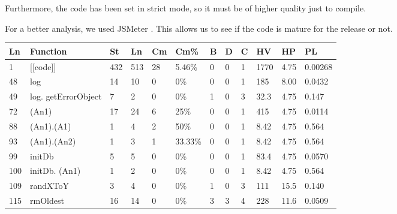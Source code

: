 Furthermore, the code has been set in strict mode, so it must be of higher quality just to compile.

For a better analysis, we used JSMeter \cite{website:jsmeter}. This allows us to see if the code is mature for the release or not.

\noindent \begin{tabular}{|l|p{56px}|l|l|l|l|l|l|l|l|l|l|}
\hline
{\bf Ln} & {\bf Function} & {\bf St} & {\bf Ln} & {\bf Cm} & {\bf Cm\%} & {\bf B} & {\bf D} & {\bf C} & {\bf HV} & {\bf HP} & {\bf PL} \\
\hline
         1 &   [[code]] &        432 &        513 &         28 &     5.46\% &          0 &          0 &          1 &       1770 &       4.75 &    0.00268 \\
\hline
        48 &        log &         14 &         10 &          0 &        0\% &          0 &          0 &          1 &        185 &       8.00 &     0.0432 \\
\hline
        49 & log. getErrorObject &          7 &          2 &          0 &        0\% &          1 &          0 &          3 &       32.3 &       4.75 &      0.147 \\
\hline
        72 & (An1) &         17 &         24 &          6 &       25\% &          0 &          0 &          1 &        415 &       4.75 &     0.0114 \\
\hline
        88 & (An1).(A1) &          1 &          4 &          2 &       50\% &          0 &          0 &          1 &       8.42 &       4.75 &      0.564 \\
\hline
        93 & (An1).(An2) &          1 &          3 &          1 &    33.33\% &          0 &          0 &          1 &       8.42 &       4.75 &      0.564 \\
\hline
        99 & initDb &          5 &          5 &          0 &        0\% &          0 &          0 &          1 &       83.4 &       4.75 &     0.0570 \\
\hline
       100 & initDb. (An1) &          1 &          2 &          0 &        0\% &          0 &          0 &          1 &       8.42 &       4.75 &      0.564 \\
\hline
       109 & randXToY &          3 &          4 &          0 &        0\% &          1 &          0 &          3 &        111 &       15.5 &      0.140 \\
\hline
       115 & rmOldest &         16 &         14 &          0 &        0\% &          3 &          3 &          4 &        228 &       11.6 &     0.0509 \\

\end{tabular}
